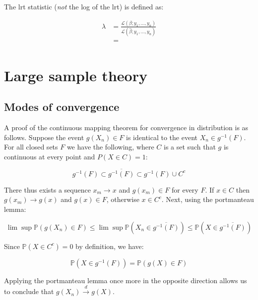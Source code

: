 \documentclass{report}
\begin{document}
The \gls{lrt} statistic (\textit{not} the log of the \gls{lrt}) is defined as:

\begin{equation}
    \begin{aligned}
        \lambda 
          &= \frac{\mathcal{L}(\beta; y_1, \dots, y_n)}{\mathcal{L}\left(\hat{\beta}; y_1, \dots, y_n\right)} \\
          &= \frac{}{}
    \end{aligned}
\end{equation}

\section{Large sample theory}\label{sec:examples-lst}

\subsection{Modes of convergence}

A proof of the continuous mapping theorem for convergence in distribution is as follows. Suppose the event $g(X_n) \in F$ is identical to the event $X_n \in g^{-1}(F)$. For all closed sets $F$ we have the following, where $C$ is a set such that $g$ is continuous at every point and $P(X \in C) = 1$:

\begin{equation}\label{eq:ex-lst-cmt-dist-proof-1}
    g^{-1}(F) \subset \overline{g^{-1}(F)} \subset g^{-1}(F) \cup C^c
\end{equation}

There thus exists a sequence $x_m \to x$ and $g(x_m) \in F$ for every $F$. If $x \in C$ then $g(x_m) \to g(x)$ and $g(x) \in F$, otherwise $x \in C^c$. Next, using the portmanteau lemma:

\begin{equation}\label{eq:ex-lst-cmt-dist-proof-2}
    \lim \sup \mathbb{P}(g(X_n) \in F) \le \lim \sup \mathbb{P}\left(X_n \in \overline{g^{-1}(F)}\right) \le \mathbb{P}\left(X \in \overline{g^{-1}(F)}\right)
\end{equation}

Since $\mathbb{P}(X \in C^c) = 0$ by definition, we have:

\begin{equation}\label{eq:ex-lst-cmt-dist-proof-3}
    \mathbb{P}(X \in g^{-1}(F)) = \mathbb{P}(g(X) \in F)
\end{equation}

Applying the portmanteau lemma once more in the opposite direction allows us to conclude that $g(X_n) \overset{d}{\to} g(X)$. 
\end{document}
